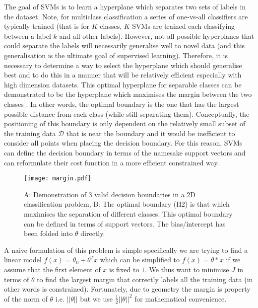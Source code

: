 The goal of SVMs is to learn a hyperplane which separates two sets of labels in the dataset. Note, for multiclass classification a series of one-vs-all
classifiers are typically trained (that is for \(K\) classes, \(K\) SVMs are trained each classifying between a label \(k\) and all other labels).
However, not all possible hyperplanes that could separate the labels will necessarily generalise well to novel data (and this generalisation
is the ultimate goal of supervised learning).  Therefore, it is necessary to determine a way to select the hyperplane which should generalise best and to do
this in a manner that will be relatively efficient especially with high dimension datasets.  This optimal hyperplane for separable classes can be demonstrated to be
the hyperplane which maximises the margin between the two classes \citep{vapnik1982estimation}. In other words, the optimal boundary is the one that has the largest
possible distance from each class (while still separating them).  Conceptually, the positioning of this boundary is only dependent
on the relatively small subset of the training data \(\mathcal{D}\) that is near the boundary and it would be inefficient to consider all points when
placing the decision boundary.  For this reason, SVMs can define the decision boundary in terms of the namesake support vectors and can reformulate
their cost function in a more efficient constrained way.

\begin{figure}[h]
    \texttt{[image: margin.pdf]}
    \caption[SVM decision boundaries]{A: Demonstration of 3 valid decision boundaries in a 2D classification problem, B: The optimal boundary (H2) is that which maximises
        the separation of different classes.  This optimal boundary can be defined in terms of support vectors.  The bias/intercept has been 
    folded into \(\theta\) directly.}
    \label{fig:margin}
\end{figure}

A naive formulation of this problem is simple specifically we are trying to find a linear model \(f(x) = \theta_{0} + \theta^{T}x\) which can be simplified 
to \(f(x) = \theta * x \) if we assume that the first element of \(x\) is fixed to \(1\). We thus want to minimise \(J\) in terms of \(\theta\) to find
the largest margin that correctly labels all the training data (in other words is constrained).  Fortunately, due to geometry the margin is property of
the norm of \(\theta\) i.e. \(||\theta||\) but we use \(\frac{1}{2} ||\theta||^{2}\) for mathematical convenience.

